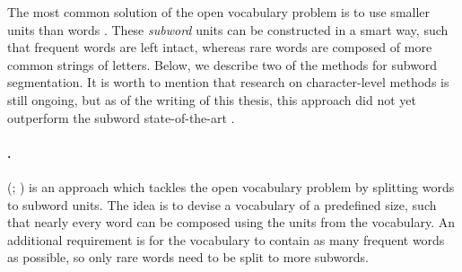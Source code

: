 The most common solution of the open vocabulary problem is to use smaller units
than words \citep{sennrich2016neural}. These \emph{subword} units can be
constructed in a smart way, such that frequent words are left intact, whereas
rare words are composed of more common strings of letters. Below, we describe
two of the methods for subword segmentation. It is worth to mention that
research on character-level methods is still ongoing, but as of the writing of
this thesis, this approach did not yet outperform the subword state-of-the-art
\citep{chung-etal-2016-character,lee-etal-2017-fully,gao-etal-2020-character}.
%
%
%
%
%
%
%
%
%
%
%
%
%
%
%
%
%
%
%
%
%
%
%
%


\paragraph{.}   
(; \citealp{sennrich2016neural}) is an approach which tackles
the open vocabulary problem by splitting words to subword units.  The idea is
to devise a vocabulary of a predefined size, such that nearly every word can be
composed using the units from the vocabulary. An additional requirement is for
the vocabulary to contain as many frequent words as possible, so only rare
words need to be split to more subwords.

